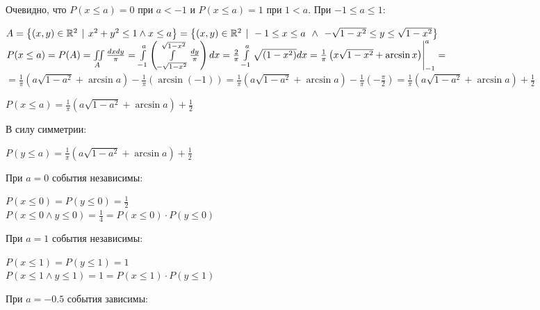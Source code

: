 \documentclass{article}
\begin{document}
	Очевидно, что $P(x\leq a) = 0$ при $a < -1$ и $P(x\leq a)=1$ при $1<a$. При $-1 \leq a \leq 1$: \\
	\begin{center}
		$A = \left\lbrace(x, y) \in \mathbb{R}^2 \hspace{4px}|\hspace{4px} x^2 + y^2 \leq 1 \wedge x \leq a \right\rbrace
		= \left\lbrace(x, y) \in \mathbb{R}^2 \hspace{4px}|\hspace{4px} -1 \leq x \leq a \hspace{4px}\wedge\hspace{4px} -\sqrt{1-x^2} \leq y \leq \sqrt{1-x^2} \right\rbrace$ \\
		
		$P(x\leq a) = P(A) = \iint\limits_{A}\frac{dxdy}{\pi} 
		= \int\limits\limits_{-1}^a \left( \int\limits\limits_{-\sqrt{1-x^2}}^{\sqrt{1-x^2}} \frac{dy}{\pi} \right)dx 
		= \frac{2}{\pi}\int\limits\limits_{-1}^a \sqrt{(1-x^2)} dx 
		= \frac{1}{\pi}\left( x\sqrt{1-x^2} + \arcsin x \right) \Biggr|_{-1}^a
		=$\\$= \frac{1}{\pi}\left( a\sqrt{1-a^2} + \arcsin a \right) - \frac{1}{\pi}\left( \arcsin(-1) \right)
		= \frac{1}{\pi}\left( a\sqrt{1-a^2} + \arcsin a \right) - \frac{1}{\pi}\left( - \frac{\pi}{2} \right)
		= \frac{1}{\pi}\left( a\sqrt{1-a^2} + \arcsin a \right) + \frac{1}{2}$\\
	\end{center}
	\begin{center}
		$P(x\leq a) = \frac{1}{\pi}\left( a\sqrt{1-a^2} + \arcsin a \right) + \frac{1}{2}$
	\end{center}
	В силу симметрии:
	\begin{center}
		$P(y\leq a) = \frac{1}{\pi}\left( a\sqrt{1-a^2} + \arcsin a \right) + \frac{1}{2}$
	\end{center}
	При $a = 0$ события независимы: 
	\begin{center}
		$P(x\leq 0) = P(y\leq 0) = \frac{1}{2}\quad $\\
		$P(x \leq 0 \wedge y \leq 0)  = \frac{1}{4} = P(x\leq 0)\cdot P(y\leq0)$
	\end{center}
	При $a = 1$ события независимы: 
	\begin{center}
		$P(x\leq 1) = P(y\leq 1) = 1\quad $\\
		$P(x \leq 1 \wedge y \leq 1)  = 1 = P(x\leq 1)\cdot P(y\leq1)$
	\end{center}
	При $a = -0.5$ события зависимы: 
\end{document}
